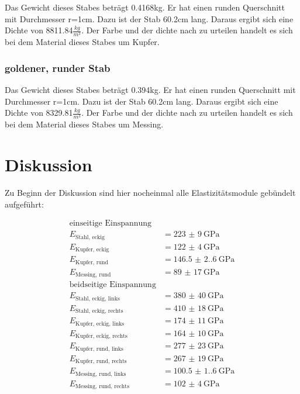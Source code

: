 Das Gewicht dieses Stabes beträgt 0.4168kg. Er hat einen runden Querschnitt mit Durchmesser r=1cm. Dazu ist der Stab 60.2cm lang. Daraus ergibt sich eine Dichte von 8811.84$\frac{kg}{m^3}$.
Der Farbe und der dichte nach zu urteilen handelt es sich bei dem Material dieses Stabes um Kupfer.

\subsubsection{goldener, runder Stab}

Das Gewicht dieses Stabes beträgt 0.394kg. Er hat einen runden Querschnitt mit Durchmesser r=1cm. Dazu ist der Stab 60.2cm lang. Daraus ergibt sich eine Dichte von 8329.81$\frac{kg}{m^3}$.
Der Farbe und der dichte nach zu urteilen handelt es sich bei dem Material dieses Stabes um Messing.

\section{Diskussion}

Zu Beginn der Diskussion sind hier nocheinmal alle Elastizitätsmodule gebündelt aufgeführt:

\begin{align*}
    \text{einseitige Einspannung}\\
    E_\text{Stahl, eckig} &=  \SI[separate-uncertainty=true]{223(9)}{\giga\pascal} \\
    E_\text{Kupfer, eckig} &= \SI[separate-uncertainty=true]{122(4)}{\giga\pascal} \\
    E_\text{Kupfer, rund} &= \SI[separate-uncertainty=true]{146.5(2.6)}{\giga\pascal} \\
    E_\text{Messing, rund} &=\SI[separate-uncertainty=true]{89(17)}{\giga\pascal}  \\
    \text{beidseitige Einspannung} \\
    E_\text{Stahl, eckig, links} &=  \SI[separate-uncertainty=true]{380(40)}{\giga\pascal}  \\
    E_\text{Stahl, eckig, rechts} &=  \SI[separate-uncertainty=true]{410(18)}{\giga\pascal}\\
    E_\text{Kupfer, eckig, links} &= \SI[separate-uncertainty=true]{174(11)}{\giga\pascal} \\
    E_\text{Kupfer, eckig, rechts} &=\SI[separate-uncertainty=true]{164(10)}{\giga\pascal} \\
    E_\text{Kupfer, rund, links} &=  \SI[separate-uncertainty=true]{277(23)}{\giga\pascal}   \\
    E_\text{Kupfer, rund, rechts} &= \SI[separate-uncertainty=true]{267(19)}{\giga\pascal}   \\
    E_\text{Messing, rund, links} &= \SI[separate-uncertainty=true]{100.5(1.6)}{\giga\pascal}\\
    E_\text{Messing, rund, rechts} &=\SI[separate-uncertainty=true]{102(4)}{\giga\pascal}    \\
\end{align*}

